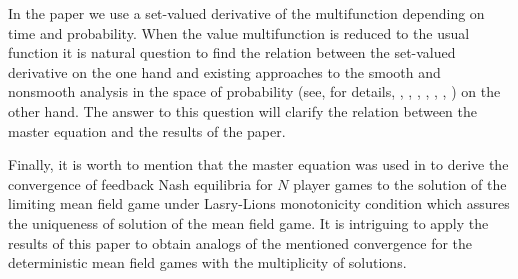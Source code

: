 \documentclass[a4paper,12pt]{article}
\begin{document}
In the paper we use a set-valued derivative of the multifunction depending on time and probability. When the value multifunction is reduced to the usual function it is natural question to find the relation between the set-valued derivative on the one hand  and existing approaches to the smooth and nonsmooth analysis in the space of probability (see, for details, \cite{Ambrosio}, \cite{Cardaliaguet_Delarue_Lasry_Lions_2015}, \cite{Carmona_Delarue_I}, \cite{Carmona_Delarue_II}, \cite{Gangbo_Nguen_Tudorascu}, \cite{Gangbo_Tudorascu}, \cite{Marigonda_Quincampoix}) on the other hand. The answer to this question will clarify the relation  between the master equation and the results of the paper.

Finally, it is worth to mention that the master equation was used in \cite{Cardaliaguet_Delarue_Lasry_Lions_2015} to derive the convergence of feedback Nash equilibria for $N$ player games to the solution of the limiting mean field game under Lasry-Lions monotonicity condition which assures the uniqueness of solution of the mean field game. It is intriguing to apply the results of this paper to obtain analogs of the mentioned convergence  for the deterministic mean field  games with the multiplicity of solutions. 
\end{document}
